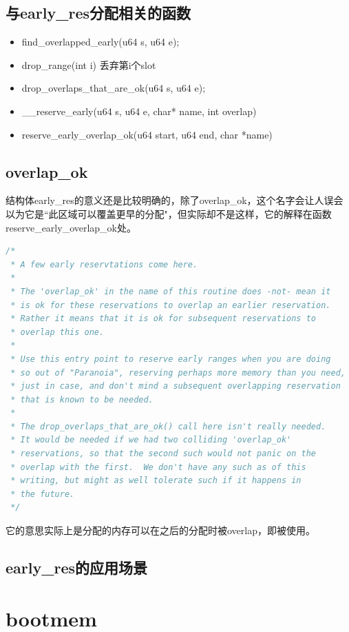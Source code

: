 \documentclass[b5paper,9pt,twoside,openany]{article}
\begin{document}
\subsection{与early\_res分配相关的函数}
\begin{itemize}
\item find\_overlapped\_early(u64 s, u64 e);
\item drop\_range(int i) 丢弃第i个slot
\item drop\_overlaps\_that\_are\_ok(u64 s, u64 e);
\item \_\_reserve\_early(u64 s, u64 e, char* name, int overlap)
\item reserve\_early\_overlap\_ok(u64 start, u64 end, char *name)
\end{itemize}

\subsection{overlap\_ok}

结构体early\_res的意义还是比较明确的，除了overlap\_ok，这个名字会让人误会以为它是“此区域可以覆盖更早的分配"，但实际却不是这样，它的解释在函数reserve\_early\_overlap\_ok处。
\begin{lstlisting}[language=C]
/*
 * A few early reservtations come here.
 *
 * The 'overlap_ok' in the name of this routine does -not- mean it
 * is ok for these reservations to overlap an earlier reservation.
 * Rather it means that it is ok for subsequent reservations to
 * overlap this one.
 *
 * Use this entry point to reserve early ranges when you are doing
 * so out of "Paranoia", reserving perhaps more memory than you need,
 * just in case, and don't mind a subsequent overlapping reservation
 * that is known to be needed.
 *
 * The drop_overlaps_that_are_ok() call here isn't really needed.
 * It would be needed if we had two colliding 'overlap_ok'
 * reservations, so that the second such would not panic on the
 * overlap with the first.  We don't have any such as of this
 * writing, but might as well tolerate such if it happens in
 * the future.
 */
\end{lstlisting}

它的意思实际上是分配的内存可以在之后的分配时被overlap，即被使用。

\subsection{early\_res的应用场景}


\section{bootmem}
\end{document}
